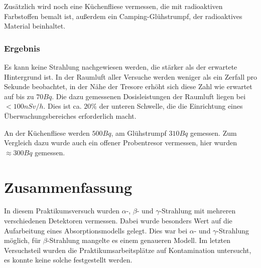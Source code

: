 \documentclass{../Misc/MontavonLaTeX/Montavon}
\begin{document}
Zusätzlich wird noch eine Küchenfliese vermessen, die mit radioaktiven Farbstoffen bemalt ist, außerdem ein Camping-Glühstrumpf, der radioaktives Material beinhaltet.

\subsubsection{Ergebnis}
Es kann keine Strahlung nachgewiesen werden, die stärker als der erwartete Hintergrund ist. In der Raumluft aller Versuche werden weniger als ein Zerfall pro Sekunde beobachtet, in der Nähe der Tresore erhöht sich diese Zahl wie erwartet auf bis zu $70 \unit{Bq}$. 
Die dazu gemessenen Dosisleistungen der Raumluft liegen bei $< 100 \unit{nSv / h}$. Dies ist ca. $20 \unit{\%}$ der unteren Schwelle, die die Einrichtung eines Überwachungsbereiches erforderlich macht.

An der Küchenfliese werden $500 \unit{Bq}$, am Glühstrumpf $310 \unit{Bq}$ gemessen. Zum Vergleich dazu wurde auch ein offener Probentresor vermessen, hier wurden $\approx 300 \unit{Bq}$ gemessen.

\section{Zusammenfassung}

In diesem Praktikumsversuch wurden $\alpha$-, $\beta$- und $\gamma$-Strahlung mit mehreren verschiedenen Detektoren vermessen. Dabei wurde besonders Wert auf die Aufarbeitung eines Absorptionsmodells gelegt. Dies war bei $\alpha$- und $\gamma$-Strahlung möglich, für $\beta$-Strahlung mangelte es einem genaueren Modell.
Im letzten Versuchsteil wurden die Praktikumsarbeitsplätze auf Kontamination untersucht, es konnte keine solche festgestellt werden.
\end{document}
